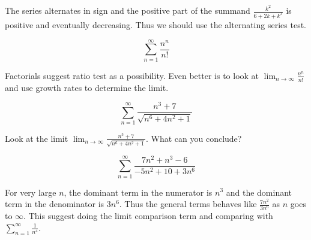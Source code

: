 \documentclass{ximera}
\begin{document}
\begin{exercise}
\begin{exercise}
\begin{multipleChoice}
\end{multipleChoice}

\begin{feedback}[correct]
The series alternates in sign and the positive part of the summand $\frac{k^2}{6+2k+k^3}$ is positive and eventually decreasing. Thus we should use
the alternating series test. 
\end{feedback}
\end{exercise}

\begin{exercise}

\[
\sum^{\infty}_{n=1} \frac{n^n}{n!}
\]


\begin{multipleChoice}
\end{multipleChoice}


\begin{feedback}[correct]
Factorials suggest ratio test as a possibility. Even better is to look at $\lim_{n \to \infty} \frac{n^n}{n!}$ and use growth rates to determine the limit. 
\end{feedback}
\end{exercise}

\begin{exercise}

\[
\sum^{\infty}_{n=1} \frac{n^3+7}{\sqrt{n^6+4n^2+1}}
\]

\begin{multipleChoice}
\end{multipleChoice}



\begin{feedback}[correct]
Look at the limit $\lim_{n \to \infty} \frac{n^3+7}{\sqrt{n^6+4n^2+1}}$. What can you conclude?
\end{feedback}
\end{exercise}


\begin{exercise}


\[
\sum^{\infty}_{n=1} \frac{7n^2+n^3-6}{-5n^2+10+3n^6}
\]


\begin{multipleChoice}
\end{multipleChoice}


\begin{feedback}[correct]
For very large $n$, the dominant term in the numerator is $n^3$ and the dominant term in the denominator is $3n^6$. Thus the general terms 
behaves like $\frac{7n^2}{3n^6}$ as $n$ goes to $\infty$. This suggest doing the limit comparison term and comparing with $\sum^{\infty}_{n=1} \frac{1}{n^4}$. 
\end{feedback}


\end{exercise}
\end{exercise}
\end{document}
